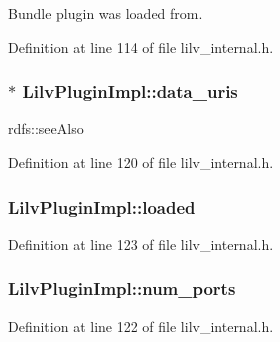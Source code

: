 Bundle plugin was loaded from. 



Definition at line 114 of file lilv\+\_\+internal.\+h.

\subsubsection[{\texorpdfstring{data\+\_\+uris}{data_uris}}]{$\ast$ Lilv\+Plugin\+Impl\+::data\+\_\+uris}\hypertarget{struct_lilv_plugin_impl_aa551d1d561ff02752bcc09f8b788a8d4}{}\label{struct_lilv_plugin_impl_aa551d1d561ff02752bcc09f8b788a8d4}


rdfs\+::see\+Also 



Definition at line 120 of file lilv\+\_\+internal.\+h.

\subsubsection[{\texorpdfstring{loaded}{loaded}}]{ Lilv\+Plugin\+Impl\+::loaded}\hypertarget{struct_lilv_plugin_impl_a690daad491d8dc3d446fd4d796ef807e}{}\label{struct_lilv_plugin_impl_a690daad491d8dc3d446fd4d796ef807e}


Definition at line 123 of file lilv\+\_\+internal.\+h.

\subsubsection[{\texorpdfstring{num\+\_\+ports}{num_ports}}]{ Lilv\+Plugin\+Impl\+::num\+\_\+ports}\hypertarget{struct_lilv_plugin_impl_ac0b1c43adf9e1d65c27a9a603d62615e}{}\label{struct_lilv_plugin_impl_ac0b1c43adf9e1d65c27a9a603d62615e}


Definition at line 122 of file lilv\+\_\+internal.\+h.

